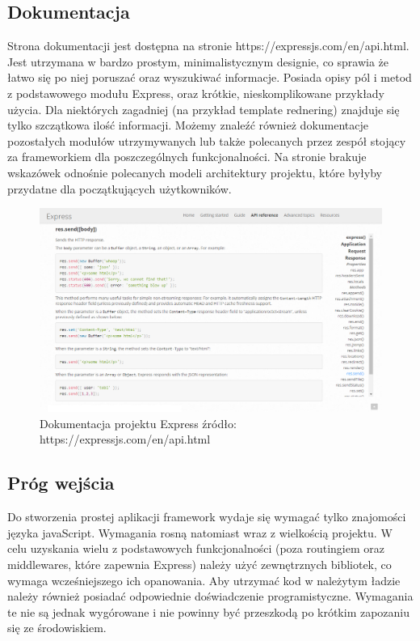 \documentclass[12pt]{report}
\begin{document}
    \subsection{Dokumentacja}
      Strona dokumentacji jest dostępna na stronie https://expressjs.com/en/api.html.
      Jest utrzymana w bardzo prostym, minimalistycznym designie, co sprawia że łatwo się po niej poruszać oraz wyszukiwać informacje.
      Posiada opisy pól i metod z podstawowego modułu Express, oraz krótkie, nieskomplikowane przykłady użycia.
      Dla niektórych zagadniej (na przykład template rednering) znajduje się tylko szczątkowa ilość informacji.
      Możemy znaleźć również dokumentacje pozostałych modułów utrzymywanych lub także polecanych przez zespół stojący za frameworkiem dla poszczególnych funkcjonalności.
      Na stronie brakuje wskazówek odnośnie polecanych modeli architektury projektu, które byłyby przydatne dla początkujących użytkowników.
      \begin{figure}[!hb]
        \centering
        \includegraphics[width=\textwidth,height=\textheight,keepaspectratio]{doc_express.png} 
        \caption{Dokumentacja projektu Express \newline źródło: https://expressjs.com/en/api.html}
      \end{figure}

    \subsection{Próg wejścia}
      Do stworzenia prostej aplikacji framework wydaje się wymagać tylko znajomości języka javaScript.
      Wymagania rosną natomiast wraz z wielkością projektu.
      W celu uzyskania wielu z podstawowych funkcjonalności (poza routingiem oraz middlewares, które zapewnia Express) należy użyć zewnętrznych bibliotek, co wymaga wcześniejszego ich opanowania. 
      Aby utrzymać kod w należytym ładzie należy również posiadać odpowiednie doświadczenie programistyczne.
      Wymagania te nie są jednak wygórowane i nie powinny być przeszkodą po krótkim zapozaniu się ze środowiskiem.
\end{document}
